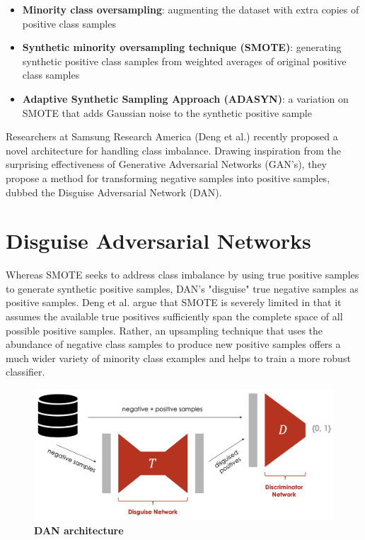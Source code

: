 \documentclass{proc}
\begin{document}
\begin{itemize}
\item{\textbf{Minority class oversampling}}: augmenting the dataset with extra copies of positive class samples
\item{\textbf{Synthetic minority oversampling technique (SMOTE)}}: generating synthetic positive class samples from weighted averages of original positive class samples
\item{\textbf{Adaptive Synthetic Sampling Approach (ADASYN)}}: a variation on SMOTE that adds Gaussian noise to the synthetic positive sample
\end{itemize}

Researchers at Samsung Research America (Deng et al.) recently proposed a novel architecture for handling class imbalance. Drawing inspiration from the surprising effectiveness of Generative Adversarial Networks (GAN's), they propose a method for transforming negative samples into positive samples, dubbed the Disguise Adversarial Network (DAN).

\section{Disguise Adversarial Networks}

Whereas SMOTE seeks to address class imbalance by using true positive samples to generate synthetic positive samples, DAN's "disguise" true negative samples as positive samples. Deng et al. argue that SMOTE is severely limited in that it assumes the available true positives sufficiently span the complete space of all possible positive samples. Rather, an upsampling technique that uses the abundance of negative class samples to produce new positive samples offers a much wider variety of minority class examples and helps to train a more robust classifier.

\begin{figure}[h!]
		\includegraphics*[scale=0.21]{../figures/architecture.png}
		\caption{\textbf{DAN architecture}}
		\label{fig:architecture}
\end{figure}
\end{document}
